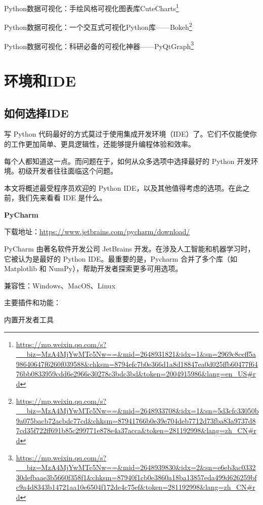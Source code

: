 \documentclass[]{ctexbook}
\renewcommand{\href}[2]{#2\footnote{\url{#1}}}
\begin{document}
\href{https://mp.weixin.qq.com/s?__biz=MzA4MjYwMTc5Nw==\&mid=2648931821\&idx=1\&sn=2969c8ceff5a98640647f6260f039588\&chksm=8794efc7b0e366d1a8d18847ea0d025ffb60477f6476bb0833959cdd6e2966e30278c3bdc3bd\&token=2004915986\&lang=en_US\#rd}{Python数据可视化：手绘风格可视化图表库CuteCharts}

\href{https://mp.weixin.qq.com/s?__biz=MzA4MjYwMTc5Nw==\&mid=2648933708\&idx=1\&sn=5d3cfc33050b9a075bacb72acbdc77cd\&chksm=87941766b0e39e704deb7712d73fba83a9737d87cd35f722ff691b85c299771e878e4a37acca\&token=281192998\&lang=zh_CN\#rd}{Python数据可视化：一个交互式可视化Python库------Bokeh}

\href{https://mp.weixin.qq.com/s?__biz=MzA4MjYwMTc5Nw==\&mid=2648939830\&idx=2\&sn=e6eb3ac033230defbaae3b5660f358f1\&chksm=87940f1cb0e3860a18ba13857eda499d626259bfc9a4d8343b14721aa10e6504f172de4c75ef\&token=281192998\&lang=zh_CN\#rd}{Python数据可视化：科研必备的可视化神器------PyQtGraph}

\hypertarget{ux73afux5883ux548cide}{%
\section{环境和IDE}\label{ux73afux5883ux548cide}}

\hypertarget{ux5982ux4f55ux9009ux62e9ide}{%
\subsection{如何选择IDE}\label{ux5982ux4f55ux9009ux62e9ide}}

写 Python 代码最好的方式莫过于使用集成开发环境（IDE）了。它们不仅能使你的工作更加简单、更具逻辑性，还能够提升编程体验和效率。

每个人都知道这一点。而问题在于，如何从众多选项中选择最好的 Python 开发环境。初级开发者往往面临这个问题。

本文将概述最受程序员欢迎的 Python IDE，以及其他值得考虑的选项。在此之前，我们先来看看 IDE 是什么。

\textbf{PyCharm}

下载地址：\url{https://www.jetbrains.com/pycharm/download/}

PyCharm 由著名软件开发公司 JetBrains 开发。在涉及人工智能和机器学习时，它被认为是最好的 Python IDE。最重要的是，Pycharm 合并了多个库（如 Matplotlib 和 NumPy），帮助开发者探索更多可用选项。

兼容性：Windows、MacOS、Linux

主要插件和功能：

内置开发者工具
\end{document}
